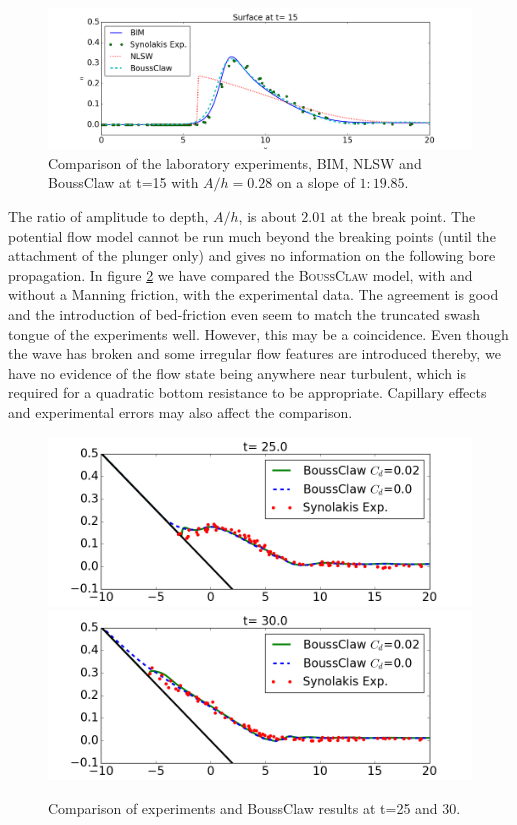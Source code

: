 \documentclass[review]{elsarticle}
\newcommand{\BoussClaw}{\textsc{BoussClaw} }
\begin{document}
\begin{figure}[!htb]
\centering
\includegraphics[width=\textwidth]{_fig/lab_bim_t15.png}
\caption{Comparison of the laboratory experiments, BIM, NLSW and BoussClaw at t=15 with $A/h=0.28$ 
on a slope of $1:19.85$.}
\label{fig:lab_bim}
\end{figure}
The ratio of amplitude to depth, $A/h$, 
is about $2.01$ at the break point.
The potential flow model cannot be run much beyond the
breaking points (until the attachment of the plunger only) and 
gives no information on the following bore propagation.
In figure \ref{fig:BoussClaw_runup} we have compared the \BoussClaw model, with and without 
a Manning friction, with the experimental data. The agreement is good and the introduction of bed-friction 
even seem to match the truncated swash tongue of the experiments well. However, this may be a coincidence. Even though
the  wave has broken and some irregular flow features are introduced thereby, we have no evidence of the flow state being
anywhere near turbulent, which is required for a quadratic bottom resistance to be appropriate. Capillary effects and 
experimental errors may also affect the comparison.
\begin{figure}[tbh!]
	\centering
	\includegraphics[width=.45\textwidth]{_fig/BoussClaw_lab_Cd_t25}
	\includegraphics[width=.45\textwidth]{_fig/BoussClaw_lab_Cd_t30}
	\caption{Comparison of experiments and BoussClaw results 
		at t=25 and 30.}
	\label{fig:BoussClaw_runup}
\end{figure}
\end{document}
